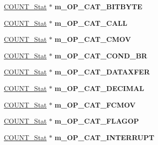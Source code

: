 \begin{DoxyCompactItemize}
\item 
\hypertarget{classall__stats__c_a6dd5aa1539ccde96e07cefebb1ca189c}{
\hyperlink{classCOUNT__Stat}{COUNT\_\-Stat} $\ast$ {\bfseries m\_\-OP\_\-CAT\_\-BITBYTE}}
\label{classall__stats__c_a6dd5aa1539ccde96e07cefebb1ca189c}

\item 
\hypertarget{classall__stats__c_a2a5e292bc9cd302332ac809ce6bc91fb}{
\hyperlink{classCOUNT__Stat}{COUNT\_\-Stat} $\ast$ {\bfseries m\_\-OP\_\-CAT\_\-CALL}}
\label{classall__stats__c_a2a5e292bc9cd302332ac809ce6bc91fb}

\item 
\hypertarget{classall__stats__c_aa4f021c64e416de319545beffadd4075}{
\hyperlink{classCOUNT__Stat}{COUNT\_\-Stat} $\ast$ {\bfseries m\_\-OP\_\-CAT\_\-CMOV}}
\label{classall__stats__c_aa4f021c64e416de319545beffadd4075}

\item 
\hypertarget{classall__stats__c_a25555b9e65ef2f4a10f2966f20cf184c}{
\hyperlink{classCOUNT__Stat}{COUNT\_\-Stat} $\ast$ {\bfseries m\_\-OP\_\-CAT\_\-COND\_\-BR}}
\label{classall__stats__c_a25555b9e65ef2f4a10f2966f20cf184c}

\item 
\hypertarget{classall__stats__c_ada309dff266534ce4c5f61c73e4d2911}{
\hyperlink{classCOUNT__Stat}{COUNT\_\-Stat} $\ast$ {\bfseries m\_\-OP\_\-CAT\_\-DATAXFER}}
\label{classall__stats__c_ada309dff266534ce4c5f61c73e4d2911}

\item 
\hypertarget{classall__stats__c_ac8ee2f353342df0af46317da0b925256}{
\hyperlink{classCOUNT__Stat}{COUNT\_\-Stat} $\ast$ {\bfseries m\_\-OP\_\-CAT\_\-DECIMAL}}
\label{classall__stats__c_ac8ee2f353342df0af46317da0b925256}

\item 
\hypertarget{classall__stats__c_aa7408e826d3c89063c5538825b3afd16}{
\hyperlink{classCOUNT__Stat}{COUNT\_\-Stat} $\ast$ {\bfseries m\_\-OP\_\-CAT\_\-FCMOV}}
\label{classall__stats__c_aa7408e826d3c89063c5538825b3afd16}

\item 
\hypertarget{classall__stats__c_af9221680f8abcaead43f377f03f75b57}{
\hyperlink{classCOUNT__Stat}{COUNT\_\-Stat} $\ast$ {\bfseries m\_\-OP\_\-CAT\_\-FLAGOP}}
\label{classall__stats__c_af9221680f8abcaead43f377f03f75b57}

\item 
\hypertarget{classall__stats__c_a496fb5a855de1d94e43f04f772b79c9b}{
\hyperlink{classCOUNT__Stat}{COUNT\_\-Stat} $\ast$ {\bfseries m\_\-OP\_\-CAT\_\-INTERRUPT}}
\label{classall__stats__c_a496fb5a855de1d94e43f04f772b79c9b}


\end{DoxyCompactItemize}
